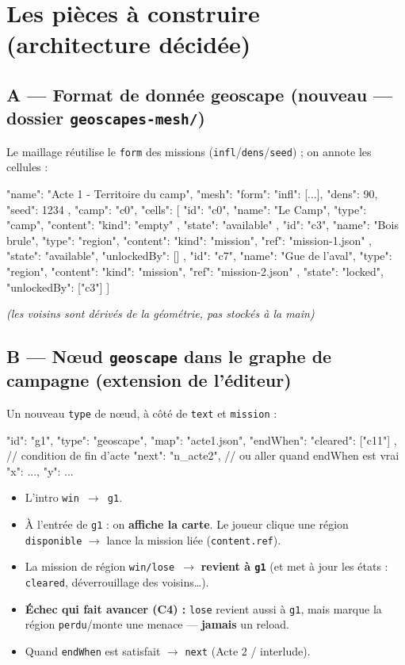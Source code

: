 \documentclass[11pt,a4paper]{article}
\begin{document}
\section{Les pièces à construire (architecture décidée)}

\subsection{A --- Format de donnée geoscape \textnormal{\small(nouveau --- dossier \texttt{geoscapes-mesh/})}}
Le maillage réutilise le \texttt{form} des missions (\texttt{infl}/\texttt{dens}/\texttt{seed}) ; on annote les cellules :
\begin{code}
{
  "name": "Acte 1 - Territoire du camp",
  "mesh": { "form": { "infl": [...], "dens": 90, "seed": 1234 } },
  "camp": "c0",
  "cells": [
    { "id": "c0", "name": "Le Camp", "type": "camp",
      "content": { "kind": "empty" }, "state": "available" },
    { "id": "c3", "name": "Bois brule", "type": "region",
      "content": { "kind": "mission", "ref": "mission-1.json" },
      "state": "available", "unlockedBy": [] },
    { "id": "c7", "name": "Gue de l'aval", "type": "region",
      "content": { "kind": "mission", "ref": "mission-2.json" },
      "state": "locked", "unlockedBy": ["c3"] }
  ]
}
\end{code}
\emph{(les voisins sont dérivés de la géométrie, pas stockés à la main)}

\subsection{B --- Nœud \texttt{geoscape} dans le graphe de campagne \textnormal{\small(extension de l'éditeur)}}
Un nouveau \texttt{type} de nœud, à côté de \texttt{text} et \texttt{mission} :
\begin{code}
{ "id": "g1", "type": "geoscape", "map": "acte1.json",
  "endWhen": { "cleared": ["c11"] },   // condition de fin d'acte
  "next": "n_acte2",                   // ou aller quand endWhen est vrai
  "x": ..., "y": ... }
\end{code}
\begin{itemize}
\item L'intro \texttt{win $\to$ g1}.
\item À l'entrée de \texttt{g1} : on \textbf{affiche la carte}. Le joueur clique une région \texttt{disponible} $\to$ lance la mission liée (\texttt{content.ref}).
\item La mission de région \texttt{win/lose $\to$} \textbf{revient à \texttt{g1}} (et met à jour les états : \texttt{cleared}, déverrouillage des voisins\dots).
\item \textbf{Échec qui fait avancer (C4) :} \texttt{lose} revient aussi à \texttt{g1}, mais marque la région \texttt{perdu}/monte une menace --- \textbf{jamais} un reload.
\item Quand \texttt{endWhen} est satisfait $\to$ \texttt{next} (Acte 2 / interlude).
\end{itemize}
\end{document}
